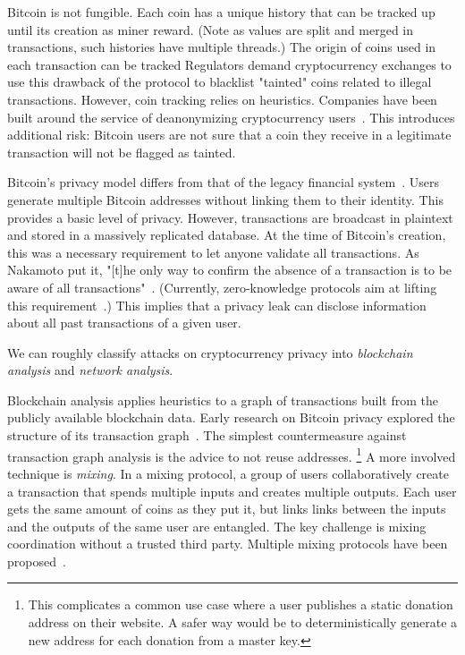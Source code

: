 Bitcoin is not fungible.
Each coin has a unique history that can be tracked up until its creation as miner reward.
(Note as values are split and merged in transactions, such histories have multiple threads.)
The origin of coins used in each transaction can be tracked 
Regulators demand cryptocurrency exchanges to use this drawback of the protocol to blacklist "tainted" coins related to illegal transactions.
However, coin tracking relies on heuristics.
Companies have been built around the service of deanonymizing cryptocurrency users~\cite{Elliptic, Chainalysis}.
This introduces additional risk: Bitcoin users are not sure that a coin they receive in a legitimate transaction will not be flagged as tainted.

Bitcoin's privacy model differs from that of the legacy financial system~\cite{Reid2011,Androulaki2013}.
Users generate multiple Bitcoin addresses without linking them to their identity.
This provides a basic level of privacy.
However, transactions are broadcast in plaintext and stored in a massively replicated database.
At the time of Bitcoin's creation, this was a necessary requirement to let anyone validate all transactions.
As Nakamoto put it, "[t]he only way to confirm the absence of a transaction is to be aware of all transactions"~\cite{Nakamoto2008}.
(Currently, zero-knowledge protocols aim at lifting this requirement~\cite{BenSasson2014, Bonneau2020}.)
This implies that a privacy leak can disclose information about all past transactions of a given user.

We can roughly classify attacks on cryptocurrency privacy into \textit{blockchain analysis} and \textit{network analysis}.

Blockchain analysis applies heuristics to a graph of transactions built from the publicly available blockchain data.
Early research on Bitcoin privacy explored the structure of its transaction graph~\cite{Meiklejohn2013, Ober2013, Ron2013}.
The simplest countermeasure against transaction graph analysis is the advice to not reuse addresses.
\footnote{This complicates a common use case where a user publishes a static donation address on their website. A safer way would be to deterministically generate a new address for each donation from a master key.}
A more involved technique is \textit{mixing}.
In a mixing protocol, a group of users collaboratively create a transaction that spends multiple inputs and creates multiple outputs.
Each user gets the same amount of coins as they put it, but links links between the inputs and the outputs of the same user are entangled.
The key challenge is mixing coordination without a trusted third party.
Multiple mixing protocols have been proposed~\cite{Maxwell2013, Bonneau2014, Ruffing2014, Valenta2015}.


